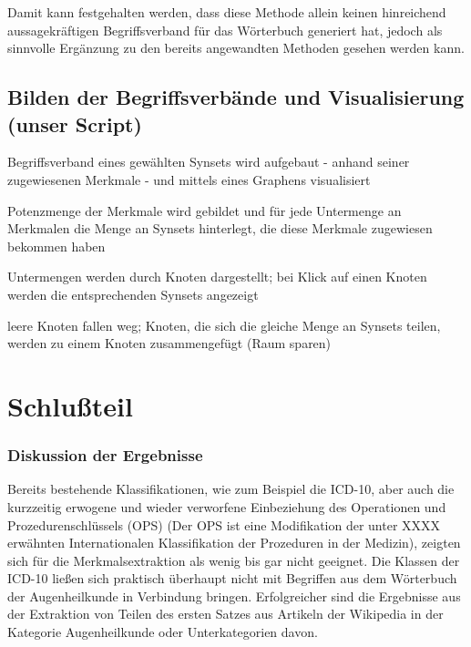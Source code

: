 \documentclass[pagesize,DIV=calc,12pt,draft]{scrreprt}
\begin{document}
Damit kann festgehalten werden, dass diese Methode allein keinen
hinreichend aussagekräftigen Begriffsverband für das Wörterbuch
generiert hat, jedoch als sinnvolle Ergänzung zu den bereits angewandten
Methoden gesehen werden kann.

\section{Bilden der Begriffsverbände und Visualisierung (unser
Script)}

\begin{inparaenum}
\item
  Begriffsverband eines gewählten Synsets wird aufgebaut - anhand seiner
  zugewiesenen Merkmale - und mittels eines Graphens visualisiert

\item
  Potenzmenge der Merkmale wird gebildet und für jede Untermenge an
  Merkmalen die Menge an Synsets hinterlegt, die diese Merkmale
  zugewiesen bekommen haben

\item
  Untermengen werden durch Knoten dargestellt; bei Klick auf einen
  Knoten werden die entsprechenden Synsets angezeigt

\item
  leere Knoten fallen weg; Knoten, die sich die gleiche Menge an Synsets
  teilen, werden zu einem Knoten zusammengefügt (Raum sparen)
\end{inparaenum}

\chapter{Schlußteil}

\subsection{Diskussion der Ergebnisse}

Bereits bestehende Klassifikationen, wie zum Beispiel die ICD-10, aber
auch die kurzzeitig erwogene und wieder verworfene Einbeziehung des
Operationen und Prozedurenschlüssels (OPS) (Der OPS ist eine
Modifikation der unter XXXX erwähnten Internationalen Klassifikation der
Prozeduren in der Medizin), zeigten sich für die Merkmalsextraktion als
wenig bis gar nicht geeignet. Die Klassen der ICD-10 ließen sich
praktisch überhaupt nicht mit Begriffen aus dem Wörterbuch der
Augenheilkunde in Verbindung bringen. Erfolgreicher sind die Ergebnisse
aus der Extraktion von Teilen des ersten Satzes aus Artikeln der
Wikipedia in der Kategorie Augenheilkunde oder Unterkategorien davon.
\end{document}

